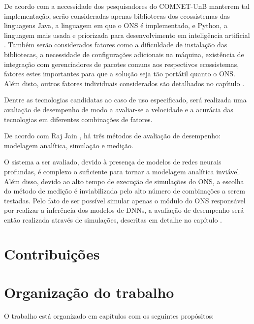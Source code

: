 De acordo com a necessidade dos pesquisadores do COMNET-UnB manterem tal implementação, serão consideradas apenas bibliotecas dos ecossistemas das linguagens Java, a linguagem em que o ONS é implementado, e Python, a linguagem mais usada e priorizada para desenvolvimento em inteligência artificial \cite{developer_nation_q1_2017}. Também serão considerados fatores como a dificuldade de instalação das bibliotecas, a necessidade de configurações adicionais na máquina, existência de integração com gerenciadores de pacotes comuns aos respectivos ecossistemas, fatores estes importantes para que a solução seja tão portátil quanto o ONS. Além disto, outros fatores individuais considerados são detalhados no capítulo .

Dentre as tecnologias candidatas ao caso de uso especificado, será realizada uma avaliação de desempenho de modo a avaliar-se a velocidade e a acurácia das tecnologias em diferentes combinações de fatores.

De acordo com Raj Jain \cite{jain1991art}, há três métodos de avaliação de desempenho: modelagem analítica, simulação e medição.

O sistema a ser avaliado, devido à presença de modelos de redes neurais profundas, é complexo o suficiente para tornar a modelagem analítica inviável. Além disso, devido ao alto tempo de execução de simulações do ONS, a escolha do método de medição é inviabilizada pelo alto número de combinações a serem testadas. Pelo fato de ser possível simular apenas o módulo do ONS responsável por realizar a inferência dos modelos de DNNs, a avaliação de desempenho será então realizada através de simulações, descritas em detalhe no capítulo \todo[Y (análise)].

\section{Contribuições}
\label{intro-contributions}

\section{Organização do trabalho}
\label{intro-org}

O trabalho está organizado em \todo[?] capítulos com os seguintes propósitos:

